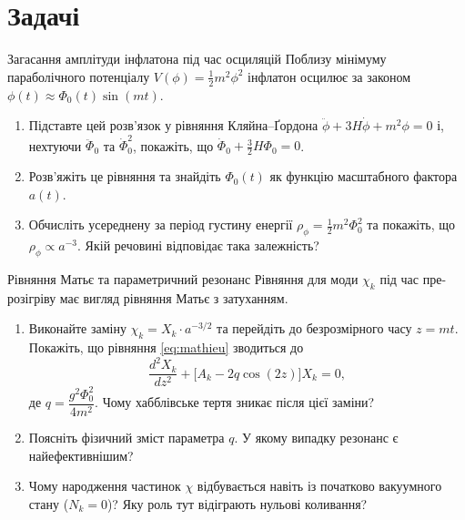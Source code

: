 \section*{Задачі}


\begin{problem}{Загасання амплітуди інфлатона під час осциляцій}
Поблизу мінімуму параболічного потенціалу $V(\phi) = \frac{1}{2}m^2\phi^2$
інфлатон осцилює за законом $\phi(t) \approx \Phi_0(t)\sin(mt)$.

\begin{enumerate}
    \item Підставте цей розв'язок у рівняння Кляйна--Ґордона
          $\ddot{\phi} + 3H\dot{\phi} + m^2\phi = 0$ і, нехтуючи $\ddot{\Phi}_0$ та $\dot{\Phi}_0^2$,
          покажіть, що $\dot{\Phi}_0 + \frac{3}{2}H\Phi_0 = 0$.
    \item Розв'яжіть це рівняння та знайдіть $\Phi_0(t)$ як функцію масштабного фактора $a(t)$.
    \item Обчисліть усереднену за період густину енергії $\rho_\phi = \frac{1}{2}m^2\Phi_0^2$
          та покажіть, що $\rho_\phi \propto a^{-3}$. Якій речовині відповідає така залежність?
\end{enumerate}
\end{problem}


\begin{problem}{Рівняння Матьє та параметричний резонанс}
Рівняння для моди $\chi_k$ під час пре-розігріву має вигляд
рівняння Матьє з затуханням.

\begin{enumerate}
    \item Виконайте заміну $\chi_k = X_k \cdot a^{-3/2}$ та перейдіть до безрозмірного
          часу $z = mt$. Покажіть, що рівняння \eqref{eq:mathieu} зводиться до
          \[
          \frac{d^2 X_k}{dz^2} + \bigl[A_k - 2q\cos(2z)\bigr] X_k = 0,
          \]
          де $q = \dfrac{g^2\Phi_0^2}{4m^2}$. Чому хабблівське тертя зникає після цієї заміни?
    \item Поясніть фізичний зміст параметра $q$. У якому випадку резонанс є найефективнішим?
    \item Чому народження частинок $\chi$ відбувається навіть із початково вакуумного стану
          ($N_k = 0$)? Яку роль тут відіграють нульові коливання?
\end{enumerate}
\end{problem}

